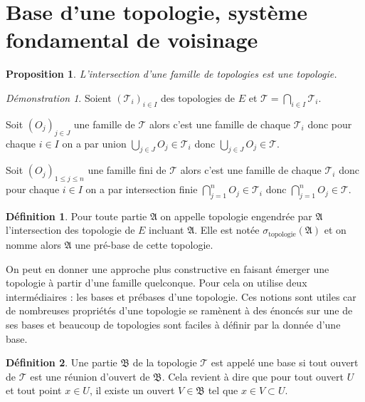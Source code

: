 \documentclass[a4paper, 11pt, french]{book}
\newenvironment{itemise}{\itemize}{\enditemize}
\theoremstyle{plain} %
\newtheorem{proposition}{Proposition}
\theoremstyle{definition} %
\newtheorem{definition}{Définition}
\theoremstyle{remark} %
\newtheorem*{demonstration}{Démonstration}
\newcommand{\1}{\mathds{1}}
\renewcommand{\frak}[1]{\mathfrak{#1}}
\newcommand{\scr}[1]{\mathscr{#1}}
\begin{document}
\section{Base d'une topologie, système fondamental de voisinage}

\begin{proposition}
	L'intersection d'une famille de topologies est une topologie.
\end{proposition}

\begin{demonstration}
	Soient $(\scr{T}_i)_{i\in I}$ des topologies de $E$ et $\scr{T}=\bigcap_{i\in I}\scr{T}_i$.
	\begin{itemise}
		\item Soit $(O_j)_{j\in J}$ une famille de $\scr{T}$ alors c'est une famille de chaque $\scr{T}_i$ donc pour chaque $i\in I$ on a par union $\bigcup_{j\in J}O_j\in\scr{T}_i$ donc $\bigcup_{j\in J}O_j\in\scr{T}$.
		\item Soit $(O_j)_{1\leqslant j\leqslant n}$ une famille fini de $\scr{T}$ alors c'est une famille de chaque $\scr{T}_i$ donc pour chaque $i\in I$ on a par intersection finie $\bigcap_{j=1}^nO_j\in\scr{T}_i$ donc $\bigcap_{j=1}^nO_j\in\scr{T}$.
	\end{itemise}
\end{demonstration}

\begin{definition}
	Pour toute partie $\frak{A}$ on appelle topologie engendrée par $\frak{A}$ l'intersection des topologie de $E$ incluant $\frak{A}$.
	Elle est notée $\sigma_\text{topologie}(\frak{A})$ et on nomme alors $\frak{A}$ une pré-base de cette topologie.
\end{definition}

On peut en donner une approche plus constructive en faisant émerger une topologie à partir d'une famille quelconque.
Pour cela on utilise deux intermédiaires : les bases et prébases d'une topologie.
Ces notions sont utiles car de nombreuses propriétés d'une topologie se ramènent à des énoncés sur une de ses bases et beaucoup de topologies sont faciles à définir par la donnée d'une base. 

\begin{definition}
	Une partie $\frak{B}$ de la topologie $\scr{T}$ est appelé une base si tout ouvert de $\scr{T}$ est une réunion d'ouvert de $\frak{B}$.
	Cela revient à dire que pour tout ouvert $U$ et tout point $x\in U$, il existe un ouvert $V\in\frak{B}$ tel que $x\in V\subset U$.
\end{definition}
\end{document}
